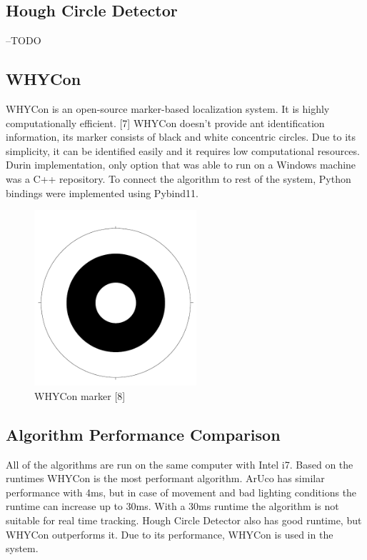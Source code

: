 \subsection{Hough Circle Detector}
--TODO


\subsection{WHYCon}

WHYCon is an open-source marker-based localization system. It is
highly computationally efficient. [7] WHYCon doesn’t provide ant
identification information, its marker consists of black and white
concentric circles. Due to its simplicity, it can be identified
easily and it requires low computational resources. Durin
implementation, only option that was able to run on a Windows
machine was a C++ repository. To connect the algorithm to rest
of the system, Python bindings were implemented using Pybind11.

\begin{figure}[!htb]\centering
    \includegraphics*[width = 6cm]{bilder/project/whycon_marker.png}
    \caption{WHYCon marker [8]}
    \label{fig:whycon marker}
\end{figure}


\subsection{Algorithm Performance Comparison}

All of the algorithms are run on the same computer with Intel i7.
Based on the runtimes WHYCon is the most performant algorithm.
ArUco has similar performance with 4ms, but in case of movement
and bad lighting conditions the runtime can increase up to 30ms.
With a 30ms runtime the algorithm is not suitable for real time
tracking. Hough Circle Detector also has good runtime, but WHYCon
outperforms it. Due to its performance, WHYCon is used in the system.

